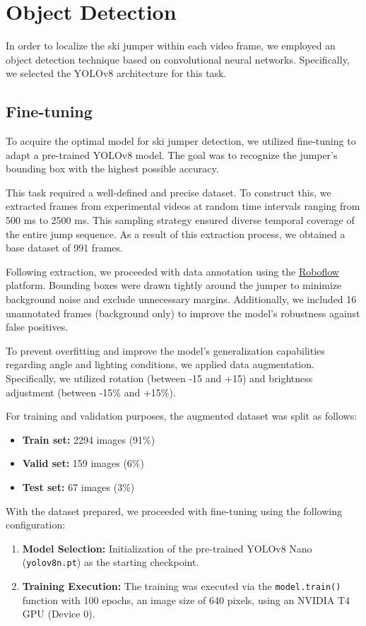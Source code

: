 \section{Object Detection}
In order to localize the ski jumper within each video frame, we employed an object detection technique based on convolutional neural networks. Specifically, we selected the YOLOv8 architecture for this task. 

\subsection{Fine-tuning}
To acquire the optimal model for ski jumper detection, we utilized fine-tuning to adapt a pre-trained YOLOv8 model. The goal was to recognize the jumper's bounding box with the highest possible accuracy.

This task required a well-defined and precise dataset. To construct this, we extracted frames from experimental videos at random time intervals ranging from 500 ms to 2500 ms. This sampling strategy ensured diverse temporal coverage of the entire jump sequence. As a result of this extraction process, we obtained a base dataset of 991 frames.

Following extraction, we proceeded with data annotation using the \href{https://app.roboflow.com/skijumpinglabeling/skijumping/2}{Roboflow} platform. Bounding boxes were drawn tightly around the jumper to minimize background noise and exclude unnecessary margins. Additionally, we included 16 unannotated frames (background only) to improve the model's robustness against false positives.

To prevent overfitting and improve the model's generalization capabilities regarding angle and lighting conditions, we applied data augmentation. Specifically, we utilized rotation (between -15\textdegree{} and +15\textdegree{}) and brightness adjustment (between -15\% and +15\%). 

For training and validation purposes, the augmented dataset was split as follows:
\begin{itemize}
    \item \textbf{Train set:} 2294 images (91\%)
    \item \textbf{Valid set:} 159 images (6\%)
    \item \textbf{Test set:} 67 images (3\%)
\end{itemize}

With the dataset prepared, we proceeded with fine-tuning using the following configuration:
\begin{enumerate}
    \item \textbf{Model Selection:} Initialization of the pre-trained YOLOv8 Nano (\texttt{yolov8n.pt}) as the starting checkpoint.
    \item \textbf{Training Execution:} The training was executed via the \texttt{model.train()} function with 100 epochs, an image size of 640 pixels, using an NVIDIA T4 GPU (Device 0).
\end{enumerate}

